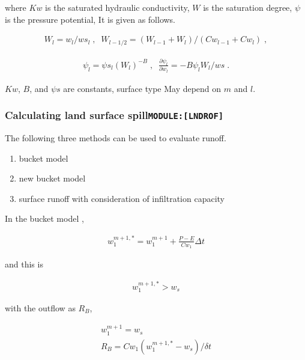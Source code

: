 where \(Kw\) is the saturated hydraulic conductivity, \(W\) is the
saturation degree, \(\psi\) is the pressure potential, It is given as
follows.

\begin{eqnarray}
  W_l = w_l / ws_l \; , \;\;
  W_{l-1/2} = (W_{l-1} + W_{l})/(Cw_{l-1} + Cw_{l}) \; ,
\end{eqnarray}

\begin{eqnarray}
  \psi_l = \psi s_l (W_l)^{-B}\; , \;\;
  \frac{\partial \psi_l}{\partial w_l} = -B \psi_l W_l / ws \; .
\end{eqnarray}

\(Kw\), \(B\), and \(\psi s\) are constants, surface type May depend on
\(m\) and \(l\).

\hypertarget{calculating-land-surface-spillmodulelndrof}{%
\subsubsection{\texorpdfstring{Calculating land surface
spill\texttt{MODULE:{[}LNDROF{]}}}{Calculating land surface spillMODULE:{[}LNDROF{]}}}\label{calculating-land-surface-spillmodulelndrof}}

The following three methods can be used to evaluate runoff.

\begin{enumerate}
\def\labelenumi{\arabic{enumi}.}
\item
  bucket model
\item
  new bucket model
\item
  surface runoff with consideration of infiltration capacity
\end{enumerate}

In the bucket model ,

\begin{eqnarray}
w_1^{m+1,*} = w_1^{m+1} +  \frac{P - E}{Cw_1} \Delta t
\end{eqnarray}

and this is

\begin{eqnarray}
 w_1^{m+1,*} > w_s 
\end{eqnarray}

with the outflow as \(R_B\),

\begin{eqnarray}
  w_1^{m+1}  =  w_s \\
  R_B   =   Cw_1 ( w_1^{m+1,*} - w_s )/\delta t
\end{eqnarray}

